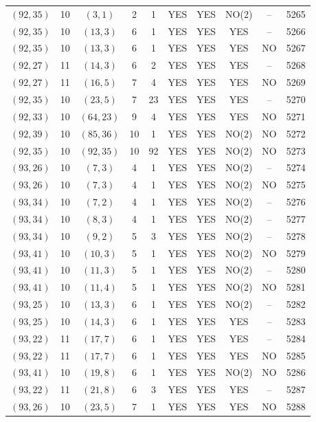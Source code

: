 \begin{longtable}{|c|c|c|c|c|c|c|c|c|c|}
$(92, 35)$ & 10 & $(3, 1)$ & 2 & 1 & YES & YES & NO(2) & -- & 5265\\
$(92, 35)$ & 10 & $(13, 3)$ & 6 & 1 & YES & YES & YES & -- & 5266\\
$(92, 35)$ & 10 & $(13, 3)$ & 6 & 1 & YES & YES & YES & NO & 5267\\
$(92, 27)$ & 11 & $(14, 3)$ & 6 & 2 & YES & YES & YES & -- & 5268\\
$(92, 27)$ & 11 & $(16, 5)$ & 7 & 4 & YES & YES & YES & NO & 5269\\
$(92, 35)$ & 10 & $(23, 5)$ & 7 & 23 & YES & YES & YES & -- & 5270\\
$(92, 33)$ & 10 & $(64, 23)$ & 9 & 4 & YES & YES & YES & NO & 5271\\
$(92, 39)$ & 10 & $(85, 36)$ & 10 & 1 & YES & YES & NO(2) & NO & 5272\\
$(92, 35)$ & 10 & $(92, 35)$ & 10 & 92 & YES & YES & NO(2) & NO & 5273\\
$(93, 26)$ & 10 & $(7, 3)$ & 4 & 1 & YES & YES & NO(2) & -- & 5274\\
$(93, 26)$ & 10 & $(7, 3)$ & 4 & 1 & YES & YES & NO(2) & NO & 5275\\
$(93, 34)$ & 10 & $(7, 2)$ & 4 & 1 & YES & YES & NO(2) & -- & 5276\\
$(93, 34)$ & 10 & $(8, 3)$ & 4 & 1 & YES & YES & NO(2) & -- & 5277\\
$(93, 34)$ & 10 & $(9, 2)$ & 5 & 3 & YES & YES & NO(2) & -- & 5278\\
$(93, 41)$ & 10 & $(10, 3)$ & 5 & 1 & YES & YES & NO(2) & NO & 5279\\
$(93, 41)$ & 10 & $(11, 3)$ & 5 & 1 & YES & YES & NO(2) & -- & 5280\\
$(93, 41)$ & 10 & $(11, 4)$ & 5 & 1 & YES & YES & NO(2) & NO & 5281\\
$(93, 25)$ & 10 & $(13, 3)$ & 6 & 1 & YES & YES & NO(2) & -- & 5282\\
$(93, 25)$ & 10 & $(14, 3)$ & 6 & 1 & YES & YES & YES & -- & 5283\\
$(93, 22)$ & 11 & $(17, 7)$ & 6 & 1 & YES & YES & YES & -- & 5284\\
$(93, 22)$ & 11 & $(17, 7)$ & 6 & 1 & YES & YES & YES & NO & 5285\\
$(93, 41)$ & 10 & $(19, 8)$ & 6 & 1 & YES & YES & NO(2) & NO & 5286\\
$(93, 22)$ & 11 & $(21, 8)$ & 6 & 3 & YES & YES & YES & -- & 5287\\
$(93, 26)$ & 10 & $(23, 5)$ & 7 & 1 & YES & YES & YES & NO & 5288\\

\end{longtable}
